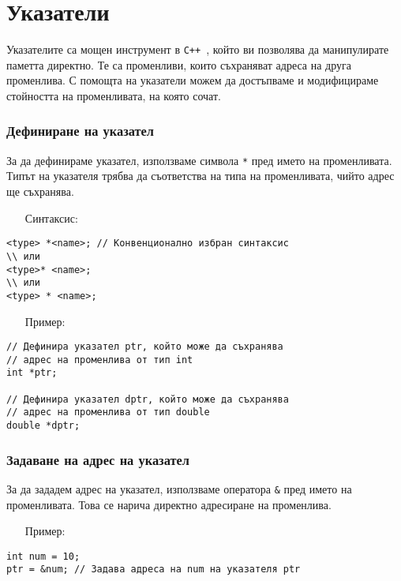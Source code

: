 \documentclass[oneside]{book}
\newcommand*{\code}[1]{\texttt{#1}}
\newcommand*{\cpp}{\texttt{C++}\ }
\begin{document}
\section{Указатели}\label{sec:pointers}
Указателите са мощен инструмент в \cpp, който ви позволява да манипулирате паметта директно. Те са променливи, които съхраняват адреса на друга променлива. С помощта на указатели можем да достъпваме и модифицираме стойността на променливата, на която сочат.

\subsubsection{Дефиниране на указател}
За да дефинираме указател, използваме символа \code{*} пред името на променливата. Типът на указателя трябва да съответства на типа на променливата, чийто адрес ще съхранява.

\begin{itemize}\item[Синтаксис:]\end{itemize}
\begin{mdframed}\begin{lstlisting}
<type> *<name>; // Конвенционално избран синтаксис
\\ или
<type>* <name>;
\\ или
<type> * <name>;
\end{lstlisting}\end{mdframed}
\pagebreak
\begin{itemize}\item[Пример:]\end{itemize}
\begin{mdframed}\begin{lstlisting}
// Дефинира указател ptr, който може да съхранява
// адрес на променлива от тип int
int *ptr;

// Дефинира указател dptr, който може да съхранява
// адрес на променлива от тип double
double *dptr;
\end{lstlisting}\end{mdframed}

\subsubsection{Задаване на адрес на указател}
За да зададем адрес на указател, използваме оператора \code{\&} пред името на променливата. Това се нарича директно адресиране на променлива.

\begin{itemize}\item[Пример:]\end{itemize}
\begin{mdframed}\begin{lstlisting}
int num = 10;
ptr = &num; // Задава адреса на num на указателя ptr
\end{lstlisting}\end{mdframed}
\end{document}
